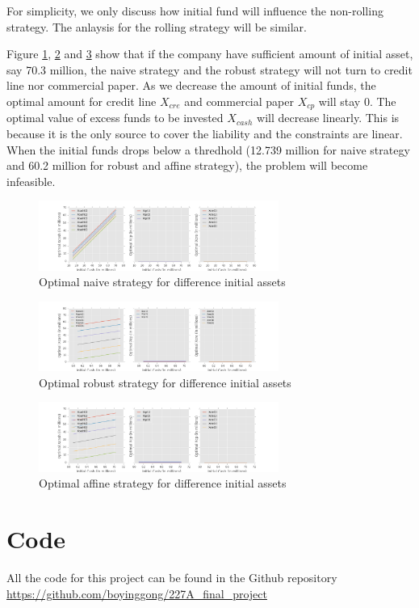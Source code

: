 \documentclass{article}
\begin{document}
For simplicity, we only discuss how initial fund will influence the non-rolling strategy. The anlaysis for the rolling strategy will be similar.

Figure \ref{fig:naive}, \ref{fig:robust} and \ref{fig:affine} show that if the company have sufficient amount of initial asset, say 70.3 million, the naive strategy and the robust strategy will not turn to credit line nor commercial paper. As we decrease the amount of initial funds, the optimal amount for credit line $X_{cre}$ and commercial paper $X_{cp}$ will stay 0. The optimal value of excess funds to be invested $X_{cash}$ will decrease linearly. This is because it is the only source to cover the liability and the constraints are linear. When the initial funds drops below a thredhold (12.739 million for naive strategy and 60.2 million for robust and affine strategy), the problem will become infeasible.

    \begin{figure}[H]
       \centering
       \includegraphics[width=0.7\textwidth]{naive.png}
        \caption{Optimal naive strategy for difference initial assets}
        \label{fig:naive}
    \end{figure}  

    \begin{figure}[H]
       \centering
       \includegraphics[width=0.7\textwidth]{robust.png}
        \caption{Optimal robust strategy for difference initial assets}
        \label{fig:robust}
    \end{figure}  

    \begin{figure}[H]
       \centering
       \includegraphics[width=0.7\textwidth]{affine.png}
        \caption{Optimal affine strategy for difference initial assets}
        \label{fig:affine}
    \end{figure}





\section{Code}\label{apx:code}

All the code for this project can be found in the Github repository \url{https://github.com/boyinggong/227A_final_project}
\end{document}
